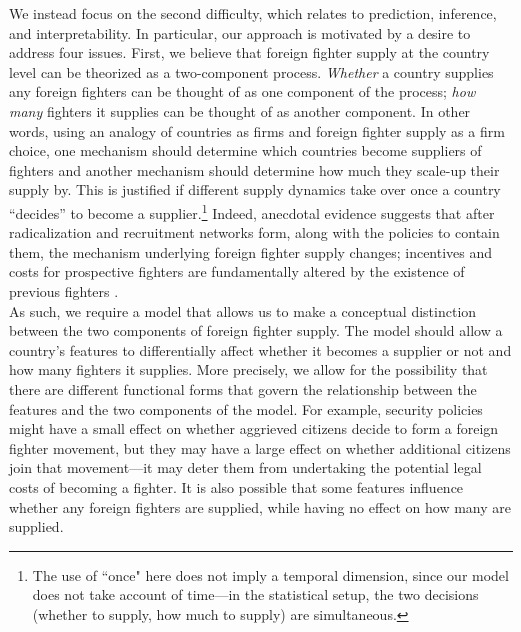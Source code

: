 \documentclass[12pt]{article}
\begin{document}
We instead focus on the second difficulty, which relates to prediction, inference, and interpretability. In particular, our approach is motivated by a desire to address four issues. First, we believe that foreign fighter supply at the country level can be theorized as a two-component process. \textit{Whether} a country supplies any foreign fighters can be thought of as one component of the process; \textit{how many} fighters it supplies can be thought of as another component. In other words, using an analogy of countries as firms and foreign fighter supply as a firm choice, one mechanism should determine which countries become suppliers of fighters and another mechanism should determine how much they scale-up their supply by. This is justified if different supply dynamics take over once a country ``decides'' to become a supplier.\footnote{The use of ``once" here does not imply a temporal dimension, since our model does not take account of time---in the statistical setup, the two decisions (whether to supply, how much to supply) are simultaneous.} Indeed, anecdotal evidence suggests that after radicalization and recruitment networks form, along with the policies to contain them, the mechanism underlying foreign fighter supply changes; incentives and costs for prospective fighters are fundamentally altered by the existence of previous fighters \citep{Felter2007, Klausen2015}.	\\

As such, we require a model that allows us to make a conceptual distinction between the two components of foreign fighter supply. The model should allow a country's features to differentially affect whether it becomes a supplier or not and how many fighters it supplies. More precisely, we allow for the possibility that there are different functional forms that govern the relationship between the features and the two components of the model. For example, security policies might have a small effect on whether aggrieved citizens decide to form a foreign fighter movement, but they may have a large effect on whether additional citizens join that movement---it may deter them from undertaking the potential legal costs of becoming a fighter. It is also possible that some features influence whether any foreign fighters are supplied, while having no effect on how many are supplied.	\\
\end{document}
